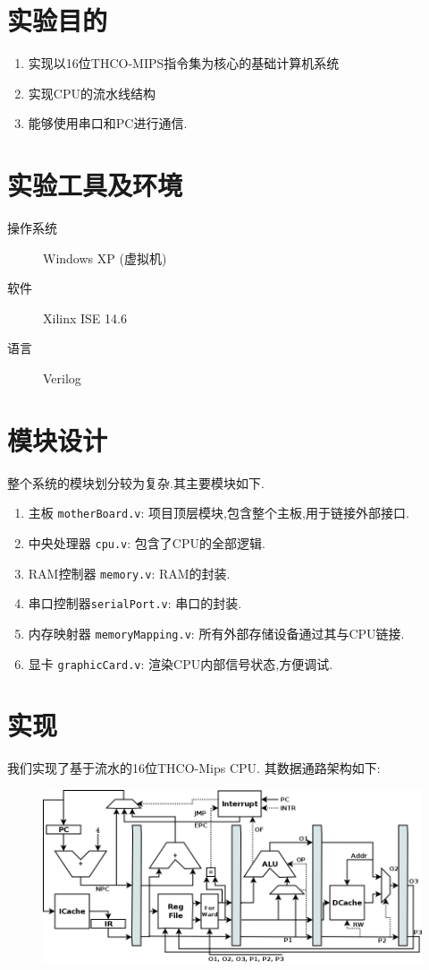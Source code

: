 
\section{实验目的}
\begin{enumerate}
  \item 实现以16位THCO-MIPS指令集为核心的基础计算机系统
  \item 实现CPU的流水线结构
  \item 能够使用串口和PC进行通信.
\end{enumerate}

\section{实验工具及环境}
\begin{description}
  \item[操作系统] Windows XP (虚拟机)
  \item[软件] Xilinx ISE 14.6
  \item[语言] Verilog
\end{description}

\section{模块设计}
整个系统的模块划分较为复杂.其主要模块如下.
\begin{enumerate}
  \item 主板 \verb|motherBoard.v|: 项目顶层模块,包含整个主板,用于链接外部接口.
  \item 中央处理器 \verb|cpu.v|: 包含了CPU的全部逻辑.
  \item RAM控制器 \verb|memory.v|: RAM的封装.
  \item 串口控制器\verb|serialPort.v|: 串口的封装.
  \item 内存映射器 \verb|memoryMapping.v|: 所有外部存储设备通过其与CPU链接.
  \item 显卡 \verb|graphicCard.v|: 渲染CPU内部信号状态,方便调试.
\end{enumerate}

\section{实现}
我们实现了基于流水的16位THCO-Mips CPU. 其数据通路架构如下:
\begin{figure}[H]
  \centering
  \includegraphics[width=\textwidth]{figure/mips.png}
\end{figure}

